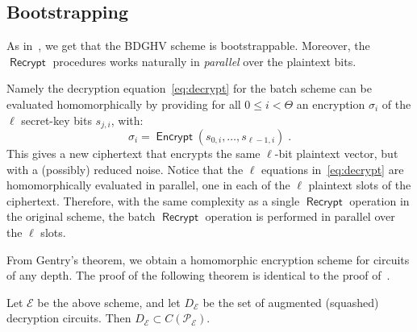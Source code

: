 \documentclass{llncs}
\renewcommand\leq\leqslant
\DeclareMathOperator{\Encrypt}{\ensuremath{\mathsf{Encrypt}}}
\DeclareMathOperator{\Recrypt}{\ensuremath{\mathsf{Recrypt}}}
\newcommand\ignore[1]{}
\begin{document}
\subsection{Bootstrapping}\label{subsec:bootstrapping}

As in~\cite{vDGHV2010}, we get that the BDGHV scheme is
bootstrappable. Moreover, the $\Recrypt$ procedures works naturally in
\emph{parallel} over the plaintext bits. 

\ignore{
In the original DGHV scheme, the decryption equation
was:
\begin{equation}
\label{eq:msz}
m \leftarrow\left[\left\lfloor\sum_{i=0}^{\Theta-1}
s_{i} \cdot z_{i}\right\rceil\right]_2 \oplus
(c \bmod 2) 
\end{equation}
and could be homomorphically evaluated by providing an
encryption $\sigma_i$ of every secret-key bit $s_i$; one would obtain a new
ciphertext which would encrypt the same plaintext bit $m$ but with a
possibly reduced noise.

Similarly, t}
Namely the decryption equation~\eqref{eq:decrypt} for the batch
scheme can be evaluated homomorphically by providing   for
all $0 \leq i < \Theta$ an encryption $\sigma_i$ of the $\ell$
secret-key bits $s_{j,i}$, with:
\[ {\sigma}_i = \Encrypt(s_{0,i}, \ldots, s_{\ell-1,i})\;. \]
This gives a new
ciphertext that encrypts the same $\ell$-bit plaintext vector,
but with a (possibly) reduced noise.  \ignore{In other words, instead of having an
homomorphic evaluation of a single 
equation~\eqref{eq:msz}, we have} Notice that the $\ell$ equations 
in~\eqref{eq:decrypt} are homomorphically evaluated in parallel, one in
each of the $\ell$ 
 plaintext slots of the ciphertext. Therefore, with the same complexity as a single $\Recrypt$
operation in the original scheme, the batch $\Recrypt$
operation is performed in parallel over the 
$\ell$ slots.

From Gentry's theorem, we obtain a homomorphic encryption scheme for
circuits of any depth. The proof of the following theorem is identical
to the proof of~\cite[Theorem~5.1]{CMNT2011}.

\begin{theorem}Let $\mathcal E$ be the above scheme, and let
  $D_{\mathcal E}$ be the set of augmented (squashed) decryption
  circuits. Then $D_{\mathcal E}\subset C(\mathcal{P_E})$. 
\end{theorem}
\end{document}
